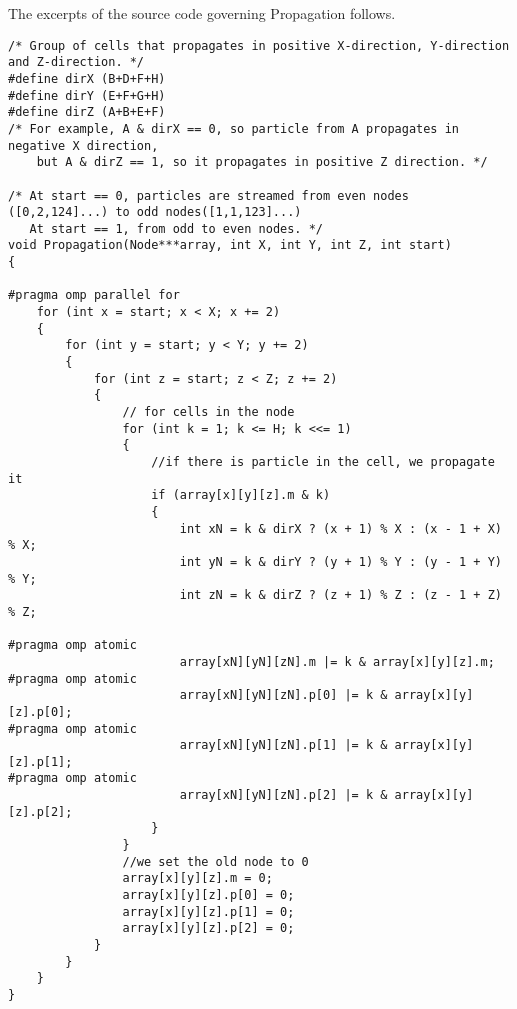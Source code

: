 The excerpts of the source code governing Propagation follows. 
\begin{lstlisting}
/* Group of cells that propagates in positive X-direction, Y-direction and Z-direction. */
#define dirX (B+D+F+H)
#define dirY (E+F+G+H)
#define dirZ (A+B+E+F)
/* For example, A & dirX == 0, so particle from A propagates in negative X direction,
    but A & dirZ == 1, so it propagates in positive Z direction. */

/* At start == 0, particles are streamed from even nodes ([0,2,124]...) to odd nodes([1,1,123]...) 
   At start == 1, from odd to even nodes. */
void Propagation(Node***array, int X, int Y, int Z, int start)
{

#pragma omp parallel for
	for (int x = start; x < X; x += 2)
	{
		for (int y = start; y < Y; y += 2)
		{
			for (int z = start; z < Z; z += 2)
			{
				// for cells in the node
				for (int k = 1; k <= H; k <<= 1)
				{
					//if there is particle in the cell, we propagate it
					if (array[x][y][z].m & k)
					{
						int xN = k & dirX ? (x + 1) % X : (x - 1 + X) % X;
						int yN = k & dirY ? (y + 1) % Y : (y - 1 + Y) % Y;
						int zN = k & dirZ ? (z + 1) % Z : (z - 1 + Z) % Z;

#pragma omp atomic
						array[xN][yN][zN].m |= k & array[x][y][z].m;
#pragma omp atomic
						array[xN][yN][zN].p[0] |= k & array[x][y][z].p[0];
#pragma omp atomic
						array[xN][yN][zN].p[1] |= k & array[x][y][z].p[1];
#pragma omp atomic
						array[xN][yN][zN].p[2] |= k & array[x][y][z].p[2];
					}
				}
				//we set the old node to 0
				array[x][y][z].m = 0;
				array[x][y][z].p[0] = 0;
				array[x][y][z].p[1] = 0;
				array[x][y][z].p[2] = 0;
			}
		}
	}
}
\end{lstlisting}